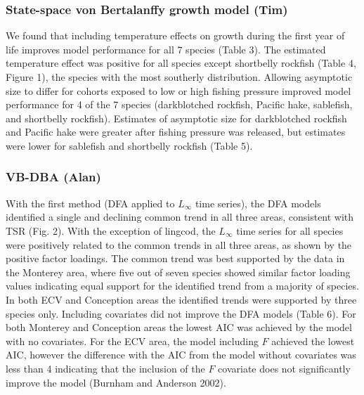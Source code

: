 \documentclass[
]{article}
\begin{document}
\hypertarget{state-space-von-bertalanffy-growth-model-tim}{%
\subsubsection{State-space von Bertalanffy growth model
(Tim)}\label{state-space-von-bertalanffy-growth-model-tim}}

We found that including temperature effects on growth during the first
year of life improves model performance for all 7 species (Table 3). The
estimated temperature effect was positive for all species except
shortbelly rockfish (Table 4, Figure 1), the species with the most
southerly distribution. Allowing asymptotic size to differ for cohorts
exposed to low or high fishing pressure improved model performance for 4
of the 7 species (darkblotched rockfish, Pacific hake, sablefish, and
shortbelly rockfish). Estimates of asymptotic size for darkblotched
rockfish and Pacific hake were greater after fishing pressure was
released, but estimates were lower for sablefish and shortbelly rockfish
(Table 5).

\hypertarget{vb-dba-alan}{%
\subsubsection{VB-DBA (Alan)}\label{vb-dba-alan}}

With the first method (DFA applied to \(L_{\infty}\) time series), the
DFA models identified a single and declining common trend in all three
areas, consistent with TSR (Fig. 2). With the exception of lingcod, the
\(L_{\infty}\) time series for all species were positively related to
the common trends in all three areas, as shown by the positive factor
loadings. The common trend was best supported by the data in the
Monterey area, where five out of seven species showed similar factor
loading values indicating equal support for the identified trend from a
majority of species. In both ECV and Conception areas the identified
trends were supported by three species only. Including covariates did
not improve the DFA models (Table 6). For both Monterey and Conception
areas the lowest AIC was achieved by the model with no covariates. For
the ECV area, the model including \(F\) achieved the lowest AIC, however
the difference with the AIC from the model without covariates was less
than 4 indicating that the inclusion of the \(F\) covariate does not
significantly improve the model (Burnham and Anderson 2002).
\end{document}
